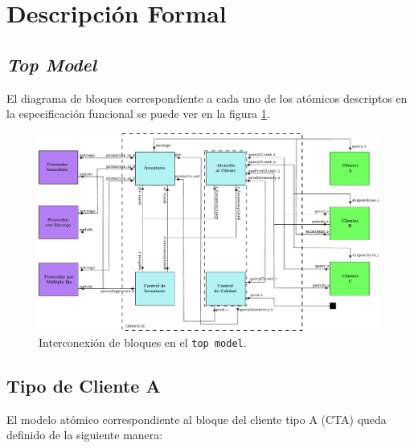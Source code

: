\documentclass[10pt]{article}
\begin{document}
\section{Descripción Formal}

\subsection{\textit{Top Model}\label{sec:TM}} 
El diagrama de bloques correspondiente a cada uno de los atómicos descriptos en la especificación funcional se puede ver en la figura \ref{fig:TM-esquematico}.  
 
\begin{figure}[h] 
  \centering 
  \includegraphics[angle=-90, width=\textwidth]{img/bloquestopmodel} 
  \caption{Interconexión de bloques en el \texttt{top model}.} 
  \label{fig:TM-esquematico} 
\end{figure}
\FloatBarrier

\subsection{Tipo de Cliente A\label{sec:CTA}}

El modelo atómico correspondiente al bloque del cliente tipo A (CTA) queda definido de la siguiente manera:

\\
\end{document}
